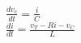 \documentclass[preview]{standalone}
\begin{document}
\begin{center}
$\frac{dv_c}{dt} = \frac{i}{C}$ \\
                             $\frac{di}{dt} = \frac{v_T - Ri - v_C}{L}$
\end{center}
\end{document}
